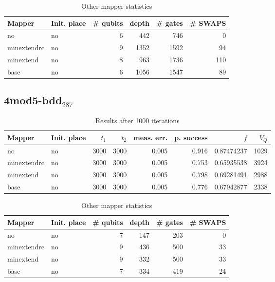 \documentclass[11pt]{article}
\begin{document}
\begin{table}[!htpb]
\caption{\label{tab:orgc2d51de}
Other mapper statistics}
\centering
\small
\begin{tabular}{llrrrr}
\hline
Mapper & Init. place & \# qubits & depth & \# gates & \# SWAPS\\
\hline
no & no & 6 & 442 & 746 & 0\\
\hline
minextendrc & no & 9 & 1352 & 1592 & 94\\
minextend & no & 8 & 963 & 1736 & 110\\
base & no & 6 & 1056 & 1547 & 89\\
\hline
\end{tabular}
\end{table}

\subsection{4mod5-bdd\(_{\text{287}}\)}
\label{sec:orgead2722}
\begin{table}[!htpb]
\caption{\label{tab:orgc714c4a}
Results after 1000 iterations}
\centering
\begin{tabular}{llrrrrrr}
\hline
Mapper & Init. place & \(t_1\) & \(t_2\) & meas. err. & p. success & \(f\) & \(V_Q\)\\
\hline
no & no & 3000 & 3000 & 0.005 & 0.916 & 0.87474237 & 1029\\
\hline
minextendrc & no & 3000 & 3000 & 0.005 & 0.753 & 0.65935538 & 3924\\
minextend & no & 3000 & 3000 & 0.005 & 0.798 & 0.69281491 & 2988\\
base & no & 3000 & 3000 & 0.005 & 0.776 & 0.67942877 & 2338\\
\hline
\end{tabular}
\end{table}


\begin{table}[!htpb]
\caption{\label{tab:org5a82cf1}
Other mapper statistics}
\centering
\small
\begin{tabular}{llrrrr}
\hline
Mapper & Init. place & \# qubits & depth & \# gates & \# SWAPS\\
\hline
no & no & 7 & 147 & 203 & 0\\
\hline
minextendrc & no & 9 & 436 & 500 & 33\\
minextend & no & 9 & 332 & 500 & 33\\
base & no & 7 & 334 & 419 & 24\\
\hline
\end{tabular}
\end{table}
\end{document}
